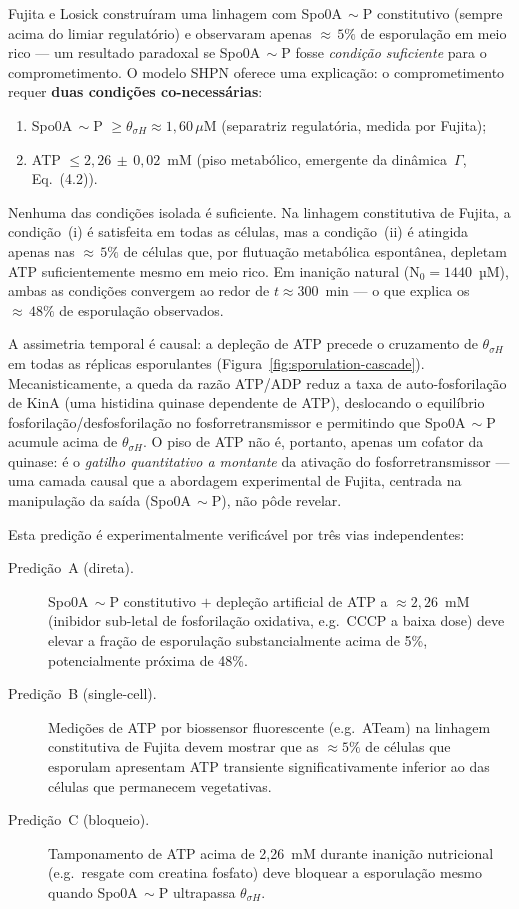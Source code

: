 Fujita e Losick construíram uma linhagem com Spo0A$\,{\sim}$P constitutivo
(sempre acima do limiar regulatório) e observaram apenas ${\approx}\,5\%$
de esporulação em meio rico --- um resultado paradoxal se
Spo0A$\,{\sim}$P fosse \emph{condição suficiente} para o comprometimento.
O modelo SHPN oferece uma explicação: o comprometimento requer
\textbf{duas condições co-necessárias}:
\begin{enumerate}
  \renewcommand{\theenumi}{\roman{enumi}}
  \renewcommand{\labelenumi}{(\theenumi)}
  \item Spo0A$\,{\sim}$P $\geq \theta_{\sigma H} \approx 1{,}60\,\mu$M
        (separatriz regulatória, medida por Fujita);
  \item ATP $\leq 2{,}26\,\pm\,0{,}02$~mM (piso metabólico,
        emergente da dinâmica~$\Gamma$, Eq.~(4.2)).
\end{enumerate}
Nenhuma das condições isolada é suficiente.
Na linhagem constitutiva de Fujita, a condição~(i) é satisfeita em
todas as células, mas a condição~(ii) é atingida apenas nas
${\approx}\,5\%$ de células que, por flutuação metabólica espontânea,
depletam ATP suficientemente mesmo em meio rico.
Em inanição natural ($\text{N}_0=1440$~µM), ambas as condições
convergem ao redor de $t \approx 300$~min --- o que explica os
${\approx}\,48\%$ de esporulação observados.

A assimetria temporal é causal: a depleção de ATP precede o
cruzamento de $\theta_{\sigma H}$ em todas as réplicas esporulantes
(Figura~\ref{fig:sporulation-cascade}).
Mecanisticamente, a queda da razão ATP/ADP reduz a taxa de
auto-fosforilação de KinA (uma histidina quinase dependente de ATP),
deslocando o equilíbrio fosforilação/desfosforilação no fosforretransmissor
e permitindo que Spo0A$\,{\sim}$P acumule acima de $\theta_{\sigma H}$.
O piso de ATP não é, portanto, apenas um cofator da quinase: é o
\emph{gatilho quantitativo a montante} da ativação do
fosforretransmissor --- uma camada causal que a abordagem experimental
de Fujita, centrada na manipulação da saída (Spo0A$\,{\sim}$P),
não pôde revelar.

Esta predição é experimentalmente verificável por três vias independentes:
\begin{description}
  \item[Predição~A (direta).] Spo0A$\,{\sim}$P constitutivo $+$
    depleção artificial de ATP a ${\approx}2{,}26$~mM (inibidor
    sub-letal de fosforilação oxidativa, e.g.\ CCCP a baixa dose)
    deve elevar a fração de esporulação substancialmente acima de 5\%,
    potencialmente próxima de 48\%.
  \item[Predição~B (single-cell).] Medições de ATP por biossensor
    fluorescente (e.g.\ ATeam) na linhagem constitutiva de Fujita
    devem mostrar que as ${\approx}5\%$ de células que esporulam
    apresentam ATP transiente significativamente inferior ao das
    células que permanecem vegetativas.
  \item[Predição~C (bloqueio).] Tamponamento de ATP acima de 2{,}26~mM
    durante inanição nutricional (e.g.\ resgate com creatina fosfato)
    deve bloquear a esporulação mesmo quando
    Spo0A$\,{\sim}$P ultrapassa $\theta_{\sigma H}$.
\end{description}

